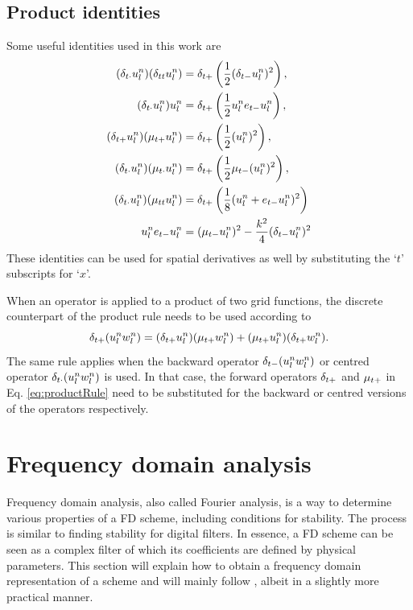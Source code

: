 \subsection{Product identities}\label{sec:prodIdentities}
Some useful identities used in this work are
\begin{subequations}
    \begin{align}
        (\delta_{t\cdot} u_l^n)(\delta_{tt} u_l^n) &= \delta_{t+} \left(\frac{1}{2}(\delta_{t-} u_l^n)^2\right),\label{eq:prodIdentity1}\\
        (\delta_{t\cdot} u_l^n)u_l^n &= \delta_{t+} \left(\frac{1}{2}u_l^n e_{t-}u_l^n\right),\label{eq:prodIdentity2}\\
        (\delta_{t+} u_l^n)(\mu_{t+} u_l^n) &= \delta_{t+} \left(\frac{1}{2}(u_l^n)^2\right),\label{eq:prodIdentity3}\\
        (\delta_{t\cdot} u_l^n)(\mu_{t\cdot}u_l^n) &= \delta_{t+}\left(\frac{1}{2} \mu_{t-}(u_l^n)^2\right),\label{eq:prodIdentity4}\\
        (\delta_{t\cdot} u_l^n)(\mu_{tt} u_l^n) &= \delta_{t+}\left(\frac{1}{8}(u_l^n + e_{t-}u_l^n)^2\right)\label{eq:prodIdentity5}\\
        u_l^n e_{t-}u_l^n &=  (\mu_{t-} u_l^n)^2 - \frac{k^2}{4}(\delta_{t-} u_l^n)^2\label{eq:prodIdentityEnergyStab}
    \end{align}
\end{subequations}
These identities can be used for spatial derivatives as well by substituting the `$t$' subscripts for `$x$'.

When an operator is applied to a product of two grid functions, the discrete counterpart of the product rule needs to be used according to
\begin{equation}\label{eq:productRule}
    \delta_{t+} (u_l^nw_l^n) = (\delta_{t+} u_l^n)(\mu_{t+}w_l^n) + (\mu_{t+} u_l^n)(\delta_{t+} w_l^n).
\end{equation}
The same rule applies when the backward operator $\delta_{t-}(u_l^nw_l^n)$ or centred operator $\delta_{t\cdot}(u_l^nw_l^n)$ is used. In that case, the forward operators $\delta_{t+}$ and $\mu_{t+}$ in Eq. \eqref{eq:productRule} need to be substituted for the backward or centred versions of the operators respectively. 

\section{Frequency domain analysis}\label{sec:stabilityAnalysis}
Frequency domain analysis, also called Fourier analysis, is a way to determine various properties of a FD scheme, including conditions for stability. The process is similar to finding stability for digital filters. In essence, a FD scheme can be seen as a complex filter of which its coefficients are defined by physical parameters.
This section will explain how to obtain a frequency domain representation of a scheme and will mainly follow \cite{theBible}, albeit in a slightly more practical manner.

